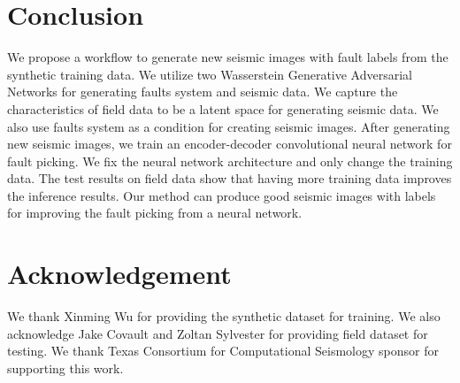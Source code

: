 

\section{Conclusion}
We propose a workflow to generate new seismic images with fault labels from the synthetic training data. We utilize two Wasserstein Generative Adversarial Networks for generating faults system and seismic data. We capture the characteristics of field data to be a latent space for generating seismic data. We also use faults system as a condition for creating seismic images. After generating new seismic images, we train an encoder-decoder convolutional neural network for fault picking. We fix the neural network architecture and only change the training data. The test results on field data show that having more training data improves the inference results. Our method can produce good seismic images with labels for improving the fault picking from a neural network.  

\section{Acknowledgement}
We thank Xinming Wu for providing the synthetic dataset for training. We also acknowledge Jake Covault and Zoltan Sylvester for providing field dataset for testing. We thank Texas Consortium for Computational Seismology sponsor for supporting this work. 

\newpage
\onecolumn





